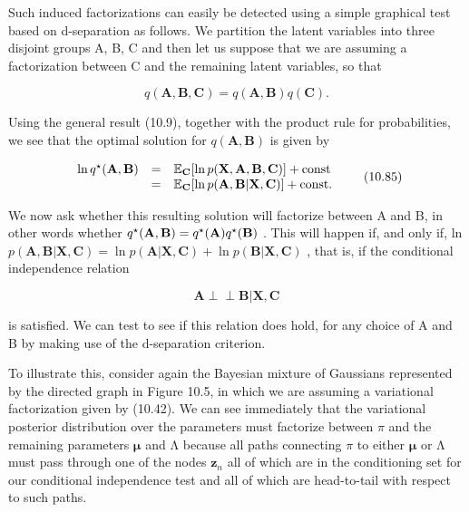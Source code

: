 \documentclass[
  10
]{article}
\begin{document}
Such induced factorizations can easily be detected using a simple
graphical test based on d-separation as follows. We partition the latent
variables into three disjoint groups A, B, C and then let us suppose
that we are assuming a factorization between C and the remaining latent
variables, so that

\[
q (\mathbf {A}, \mathbf {B}, \mathbf {C}) = q (\mathbf {A}, \mathbf {B}) q (\mathbf {C}).\tag{10.84}
\]

Using the general result (10.9), together with the product rule for
probabilities, we see that the optimal solution for
\(q ( \mathbf { A } , \mathbf { B } )\) is given by

\[
\begin{array}{r c l} \ln q ^ {\star} (\mathbf {A}, \mathbf {B}) & = & \mathbb {E} _ {\mathbf {C}} [ \ln p (\mathbf {X}, \mathbf {A}, \mathbf {B}, \mathbf {C}) ] + \mathrm{const} \\ & = & \mathbb {E} _ {\mathbf {C}} [ \ln p (\mathbf {A}, \mathbf {B} | \mathbf {X}, \mathbf {C}) ] + \mathrm{const}. \end{array}\tag{10.85}
\]

We now ask whether this resulting solution will factorize between A and
B, in other words whether
\(q ^ { \star } ( { \bf A } , { \bf B } ) = q ^ { \star } ( { \bf A } ) q ^ { \star } ( { \bf B } )\)
. This will happen if, and only if, ln
\(p ( \mathbf { A } , \mathbf { B } | \mathbf { X } , \mathbf { C } ) = \ln p ( \mathbf { A } | \mathbf { X } , \mathbf { C } ) + \ln p ( \mathbf { B } | \mathbf { X } , \mathbf { C } )\)
, that is, if the conditional independence relation

\[
\mathbf {A} \perp \perp \mathbf {B} | \mathbf {X}, \mathbf {C}\tag{10.86}
\]

is satisfied. We can test to see if this relation does hold, for any
choice of A and B by making use of the d-separation criterion.

To illustrate this, consider again the Bayesian mixture of Gaussians
represented by the directed graph in Figure 10.5, in which we are
assuming a variational factorization given by (10.42). We can see
immediately that the variational posterior distribution over the
parameters must factorize between \(\pi\) and the remaining parameters
\(\pmb { \mu }\) and Λ because all paths connecting \(\pi\) to either
\(\pmb { \mu }\) or Λ must pass through one of the nodes
\(\mathbf { z } _ { n }\) all of which are in the conditioning set for
our conditional independence test and all of which are head-to-tail with
respect to such paths.
\end{document}
